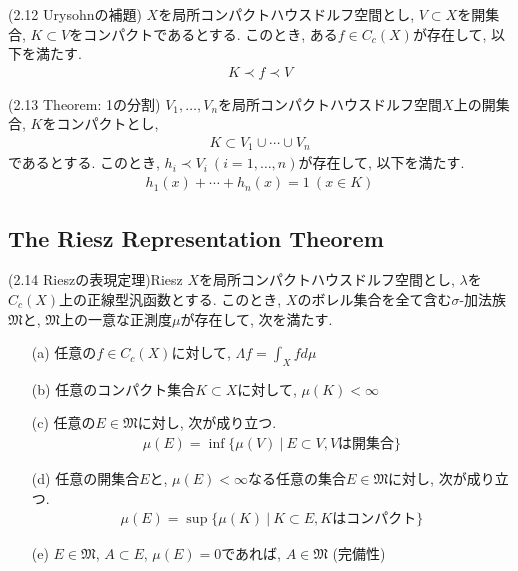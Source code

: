 \documentclass[a4paper]{jsarticle}
\begin{document}
\begin{thm}{(2.12 Urysohnの補題)}{}
    $X$を局所コンパクトハウスドルフ空間とし, $V\subset X$を開集合, $K\subset V$をコンパクトであるとする. このとき, ある$f\in C_c(X)$が存在して, 以下を満たす.
    \begin{align*}
        K\prec f\prec V
    \end{align*}
\end{thm}
\begin{thm}{(2.13 Theorem: 1の分割)}{}
    $V_1, \dots, V_n$を局所コンパクトハウスドルフ空間$X$上の開集合, $K$をコンパクトとし, 
    \begin{align*}
        K\subset V_1\cup \cdots \cup V_n
    \end{align*}
    であるとする. このとき, $h_i \prec V_i\ (i=1, \dots, n)$が存在して, 以下を満たす.
    \begin{align*}
        h_1(x)+\cdots+h_n(x) = 1 \ (x\in K)
    \end{align*}
\end{thm}

\subsection{The Riesz Representation Theorem}
\begin{thm}{(2.14 Rieszの表現定理)}{Riesz}
    $X$を局所コンパクトハウスドルフ空間とし, $\lambda$を$C_c(X)$上の正線型汎函数とする. このとき, $X$のボレル集合を全て含む$\sigma$-加法族$\mathfrak{M}$と, $\mathfrak{M}$上の一意な正測度$\mu$が存在して, 次を満たす.
    \begin{enumerate}
        \item[(a)] 任意の$f\in C_c(X)$に対して, $\Lambda f = \int _X f d\mu$
        \item[(b)] 任意のコンパクト集合$K\subset X$に対して, $\mu(K)<\infty$
        \item[(c)] 任意の$E\in \mathfrak{M}$に対し, 次が成り立つ.
        \begin{align*}
            \mu(E) = \inf \{ \mu(V) \ | \ E\subset V, Vは開集合 \}
        \end{align*}
        \item[(d)] 任意の開集合$E$と, $\mu(E)<\infty$なる任意の集合$E\in \mathfrak{M}$に対し, 次が成り立つ.
        \begin{align*}
            \mu(E) = \sup \{ \mu(K) \ | \ K\subset E, K はコンパクト \}
        \end{align*}
        \item[(e)] $E\in \mathfrak{M}$, $A\subset E$, $\mu(E)=0$であれば, $A\in \mathfrak{M}$ (完備性)
    \end{enumerate}
\end{thm}
\end{document}
